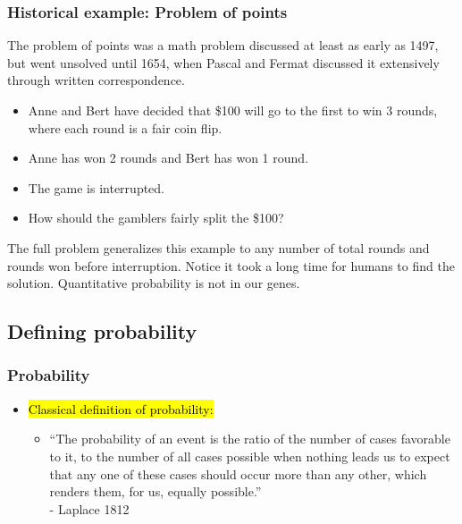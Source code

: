 
\begin{frame}
\frametitle{Historical example: Problem of points}
The problem of points was a math problem discussed at least as early as 1497, but went unsolved until 1654, when Pascal and Fermat discussed it extensively through written correspondence.

\begin{itemize}
\item Anne and Bert have decided that \$100 will go to the first to win 3 rounds, where each round is a fair coin flip.
\item Anne has won 2 rounds and Bert has won 1 round.
\item The game is interrupted.
\item How should the gamblers fairly split the \$100?
\pause
\end{itemize}

The full problem generalizes this example to any number of total rounds and rounds won before interruption. Notice it took a long time for humans to find the solution. Quantitative probability is not in our genes.

\end{frame}



\subsection{Defining probability}


\begin{frame}
\frametitle{Probability}
\begin{itemize}
\item \hl{Classical definition of probability:}
\begin{itemize}
\item ``The probability of an event is the ratio of the number of cases favorable to it, to the number of all cases possible when nothing leads us to expect that any one of these cases should occur more than any other, which renders them, for us, equally possible.'' 
\\- Laplace 1812
\end{itemize}
\end{itemize}
\end{frame}


